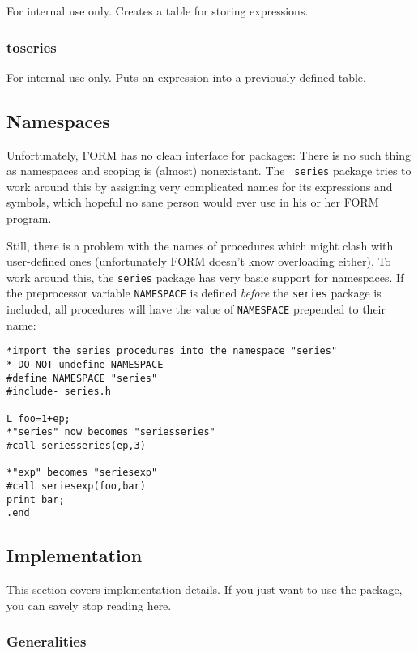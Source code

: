 \documentclass{article}
\begin{document}
For internal use only. Creates a table for storing expressions.

\subsubsection{toseries}
\label{sec:toseries}

For internal use only. Puts an expression into a previously defined table.

\subsection{Namespaces}
\label{sec:namesp}

Unfortunately, FORM has no clean interface for packages: There is no
such thing as namespaces and scoping is (almost) nonexistant. The {\tt
  series} package tries to work around this by assigning very complicated
names for its expressions and symbols, which hopeful no sane person
would ever use in his or her FORM program.

Still, there is a problem with the names of procedures which might clash
with user-defined ones (unfortunately FORM doesn't know overloading
either). To work around this, the {\tt series} package has very basic
support for namespaces. If the preprocessor variable {\tt NAMESPACE} is
defined {\em before} the {\tt series} package is included, all
procedures will have the value of {\tt NAMESPACE} prepended to their name:
\begin{verbatim}
*import the series procedures into the namespace "series"
* DO NOT undefine NAMESPACE
#define NAMESPACE "series"
#include- series.h

L foo=1+ep;
*"series" now becomes "seriesseries"
#call seriesseries(ep,3)

*"exp" becomes "seriesexp"
#call seriesexp(foo,bar)
print bar;
.end
\end{verbatim}

\subsection{Implementation}
\label{sec:impl}

This section covers implementation details. If you just want to use the
package, you can savely stop reading here.

\subsubsection{Generalities}
\label{sec:impl_general}
\end{document}
